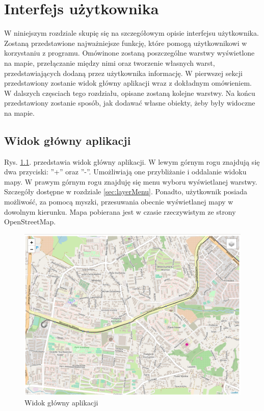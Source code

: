 \chapter{Interfejs użytkownika}
\label{cha:UI}
W niniejszym rozdziale skupię się na szczegółowym opisie interfejsu użytkownika. Zostaną przedstawione najważniejsze funkcję, które pomogą użytkownikowi w korzystaniu z programu. Omówinone zostaną poszczególne warstwy wyświetlone na mapie, przełączanie między nimi oraz tworzenie własnych warst, przedstawiających dodaną przez użytkownika informację. W pierwszej sekcji przedstawiony zostanie widok główny aplikacji wraz z dokładnym omówieniem. W dalszych częsciach tego rozdziału, opisane zostaną kolejne warstwy. Na końcu przedstawiony zostanie sposób, jak dodawać własne obiekty, żeby były widoczne na mapie.
\newpage
\section{Widok główny aplikacji}
\label{sec:mainView}

Rys. \ref{mainView}. przedstawia widok główny aplikacji. W lewym górnym rogu znajdują się dwa przyciski: ''+'' oraz ''-''. Umożliwiają one przybliżanie i oddalanie widoku mapy. W prawym górnym rogu znajduję się menu wyboru wyświetlanej warstwy. Szczegóły dostępne w rozdziale \ref{sec:layerMenu}. Ponadto, użytkownik posiada możliwość, za pomocą myszki, przesuwania obecnie wyświetlanej mapy w dowolnym kierunku. Mapa pobierana jest w czasie rzeczywistym ze strony OpenStreetMap.

\begin{figure}[h]
\caption{Widok główny aplikacji}
\label{mainView}
\centering
\includegraphics[width=1.1\textwidth]{mainScreen}
\end{figure}

